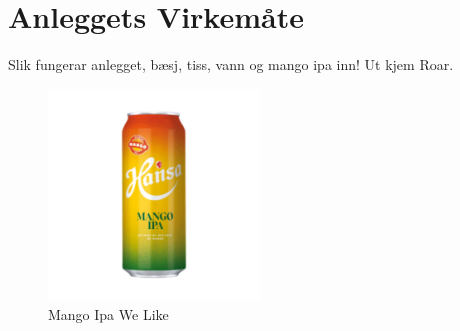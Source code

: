 \chapter{Anleggets Virkemåte}
\thispagestyle{fancy}
Slik fungerar anlegget, bæsj, tiss, vann og mango ipa inn! Ut kjem Roar.

\begin{figure}[htbp]
    \centering
    \includegraphics[width=0.5\textwidth]{Bilder/mango.jpg}
    \caption{Mango Ipa We Like}
    \label{fig:Mango-Logo}
\end{figure}
    